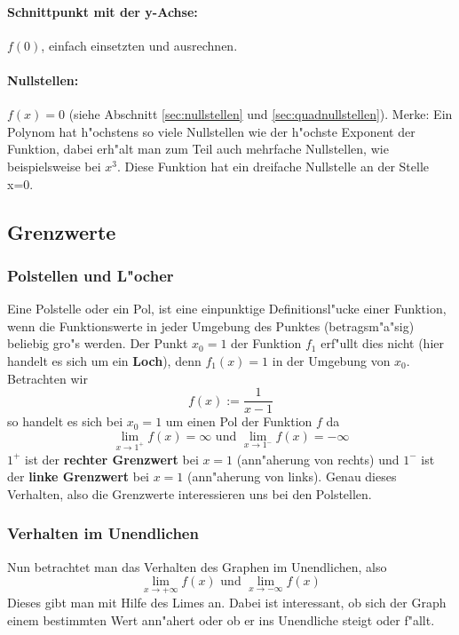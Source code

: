 \paragraph{Schnittpunkt mit der y-Achse:} $f(0)$, einfach einsetzten und ausrechnen.

\paragraph{Nullstellen:} $f(x) = 0$ (siehe Abschnitt \ref{sec:nullstellen} und \ref{sec:quadnullstellen}). Merke: Ein Polynom hat h"ochstens so viele Nullstellen wie der h"ochste Exponent der Funktion, dabei erh"alt man zum Teil auch mehrfache Nullstellen, wie beispielsweise bei $x^3$. Diese Funktion hat ein dreifache Nullstelle an der Stelle x=0.

\subsection{Grenzwerte} \label{sec:grenzwerte}
\subsubsection{Polstellen und L"ocher}
Eine Polstelle oder ein Pol, ist eine einpunktige Definitionsl"ucke einer Funktion, wenn die Funktionswerte in jeder Umgebung des Punktes (betragsm"a"sig) beliebig gro"s werden. Der Punkt $x_0 = 1$ der Funktion $f_1$ erf"ullt dies nicht (hier handelt es sich um ein \textbf{Loch}), denn $f_1(x) = 1$ in der Umgebung von $x_0$. Betrachten wir 
\begin{equation*}
f(x) := \frac{1}{x-1}
\end{equation*}
so handelt es sich bei $x_0 = 1$ um einen Pol der Funktion $f$ da
\begin{equation*}
\lim\limits_{x \to 1^+} f(x) = \infty \text{ und } \lim\limits_{x \to 1^-} f(x) = -\infty
\end{equation*}
$1^+$ ist der \textbf{rechter Grenzwert} bei $x=1$ (ann"aherung von rechts) und $1^-$ ist der \textbf{linke Grenzwert} bei $x=1$ (ann"aherung von links). Genau dieses Verhalten, also die Grenzwerte interessieren uns bei den Polstellen.

\subsubsection{Verhalten im Unendlichen}
Nun betrachtet man das Verhalten des Graphen im Unendlichen, also
\begin{equation*}
\lim\limits_{x \to +\infty} f(x) \text{ und } \lim\limits_{x \to -\infty} f(x) 
\end{equation*}
Dieses gibt man mit Hilfe des Limes an. Dabei ist interessant, ob sich der Graph einem bestimmten Wert ann"ahert oder ob er ins Unendliche steigt oder f"allt.

